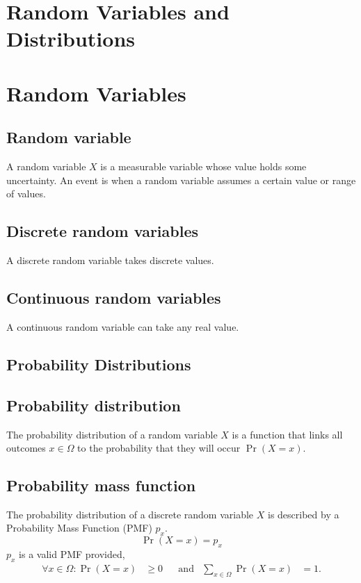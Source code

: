 \documentclass{article}
\begin{document}
\begin{multicols}{3}
    \section{Random Variables and Distributions}
    \section{Random Variables}
    \subsection{Random variable}
    A random variable \(X\) is a measurable variable whose value holds some uncertainty.
    An event is when a random variable assumes a certain value or range of values.
    \subsection{Discrete random variables}
    A discrete random variable takes discrete values.
    \subsection{Continuous random variables}
    A continuous random variable can take any real value.
    \subsection{Probability Distributions}
    \subsection{Probability distribution}
    The probability distribution of a random variable \(X\) is a function that links all outcomes \(x \in \Omega\)
    to the probability that they will occur \(\Pr{\left( X = x \right)}\).
    \subsection{Probability mass function}
    The probability distribution of a discrete random variable \(X\) is described by a Probability
    Mass Function (PMF) \(p_x\).
    \begin{equation*}
        \Pr{\left( X = x \right)} = p_x
    \end{equation*}
    \(p_x\) is a valid PMF provided,
    \begin{align*}
        \forall x \in \Omega : \Pr{\left( X = x \right)} & \geq 0 &  & \text{and} & \sum_{x \in \Omega} \Pr{\left( X = x \right)} & = 1.
    \end{align*}

\end{multicols}
\end{document}
